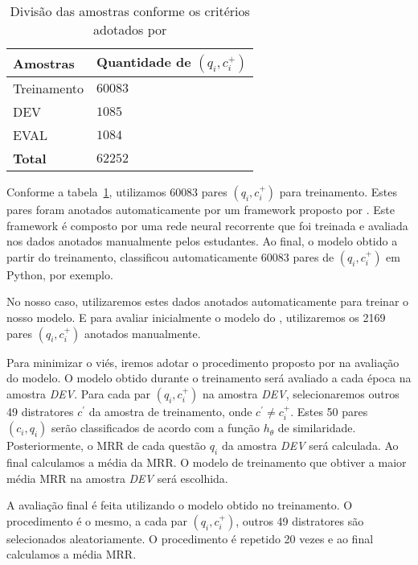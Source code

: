 \documentclass[12pt]{article}
\begin{document}
\begin{table}[h]
\centering
\begin{tabular}{ |p{3cm}|p{3cm}|  }
 \hline
 \textbf{Amostras} & \textbf{Quantidade de $(q_{i}, c_{i}^{+})$}\\
 \hline
 Treinamento & $60083$\\
 \hline
 DEV & $1085$ \\
 \hline
 EVAL & $1084$\\
 \hline
 \textbf{Total} & $62252$\\
 \hline
\end{tabular}
\caption{Divisão das amostras conforme os critérios adotados por \cite{iyer-etal-2016-summarizing}}
\label{table:divisao-amostras}
\end{table}

Conforme a tabela~\ref{table:divisao-amostras}, utilizamos 60083 pares $(q_{i}, c_{i}^{+})$ para treinamento. Estes pares foram anotados automaticamente por um framework proposto por \cite{Yao-staqc:2018}. Este framework é composto por uma rede neural recorrente que foi treinada e avaliada nos dados anotados manualmente pelos estudantes. Ao final, o modelo obtido a partir do treinamento, classificou automaticamente 60083 pares de $(q_{i}, c_{i}^{+})$ em Python, por exemplo.

No nosso caso, utilizaremos estes dados anotados automaticamente para treinar o nosso modelo. E para avaliar inicialmente o modelo do \cite{tan-lstm-qa}, utilizaremos os 2169 pares $(q_{i}, c_{i}^{+})$ anotados manualmente.

Para minimizar o viés, iremos adotar o procedimento proposto por \cite{iyer-etal-2016-summarizing} na avaliação do modelo. O modelo obtido durante o treinamento será avaliado a cada época na amostra \emph{DEV}. Para cada par $(q_{i}, c_{i}^{+})$ na amostra \emph{DEV}, selecionaremos outros 49 distratores $c^{'}$ da amostra de treinamento, onde $c^{'} \neq c_{i}^{+}$. Estes 50 pares $(c_{i}, q_{i})$ serão classificados de acordo com a função $h_{\theta}$ de similaridade. Posteriormente, o MRR de cada questão $q_{i}$ da amostra \emph{DEV} será calculada. Ao final calculamos a média da MRR. O modelo de treinamento que obtiver a maior média MRR na amostra \emph{DEV} será escolhida. 

A avaliação final é feita utilizando o modelo obtido no treinamento. O procedimento é o mesmo, a cada par $(q_{i}, c_{i}^{+})$, outros 49 distratores são selecionados aleatoriamente. O procedimento é repetido 20 vezes e ao final calculamos a média MRR.
\end{document}
